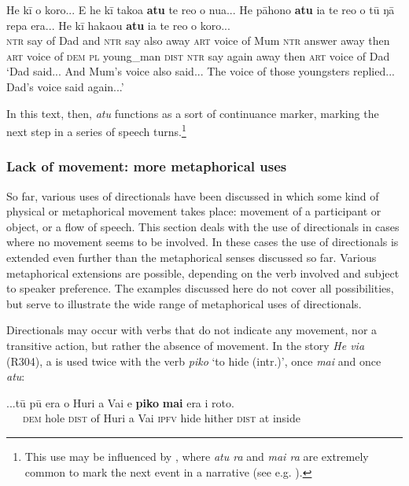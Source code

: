 \ea\label{ex:7.142}
\gll He kī o koro... {\ꞌ}E he kī tako{\ꞌ}a \textbf{atu} te re{\ꞌ}o o nua... He pāhono  \textbf{atu} ia te re{\ꞌ}o o tū ŋā repa era... He kī haka{\ꞌ}ou \textbf{atu} ia te re{\ꞌ}o o koro...\\
\textsc{ntr} say of Dad and \textsc{ntr} say also away \textsc{art} voice of Mum \textsc{ntr} answer  away then \textsc{art} voice of \textsc{dem} \textsc{pl} young\_man \textsc{dist} \textsc{ntr} say again away then \textsc{art} voice of Dad\\

\glt
‘Dad said... And Mum’s voice also said... The voice of those youngsters replied... Dad’s voice said again...’ \textstyleExampleref{[R313.009–015]}
\z

In this text, then, \textit{atu} functions as a sort of continuance marker, marking the next step in a series of speech turns.\footnote{\label{fn:356}This use may be influenced by , where \textit{atu ra} and \textit{mai ra} are extremely common to mark the next event in a narrative (see e.g. \citealt[134]{LazardPeltzer2000}).} 

\subsubsection[Lack of movement: more metaphorical uses]{Lack of movement: more metaphorical uses}\label{sec:7.5.1.4}

So far, various uses of directionals have been discussed in which some kind of physical or metaphorical movement takes place: movement of a participant or object, or a flow of speech. This section deals with the use of directionals in cases where no movement seems to be involved. In these cases the use of directionals is extended even further than the metaphorical senses discussed so far. Various metaphorical extensions are possible, depending on the verb involved and subject to speaker preference. The examples discussed here do not cover all possibilities, but serve to illustrate the wide range of metaphorical uses of directionals.

Directionals may occur with verbs that do not indicate any movement, nor a transitive action, but rather the absence of movement. In the story \textit{He via} (R304), a  is used twice with the verb \textit{piko} ‘to hide (intr.)’, once \textit{mai} and once \textit{atu}:

\ea\label{ex:7.143}
\gll ...tū pū era o Huri {\ꞌ}a Vai e \textbf{piko} \textbf{mai} era {\ꞌ}i roto. \\
~~~\textsc{dem} hole \textsc{dist} of Huri a Vai \textsc{ipfv} hide hither \textsc{dist} at inside \\

